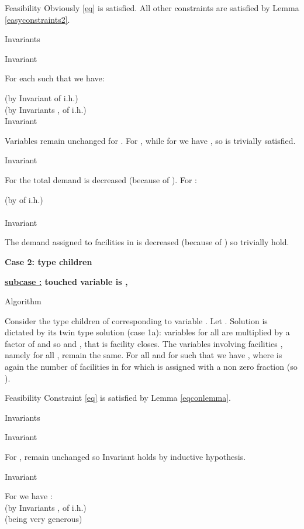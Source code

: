 \documentclass[11pt]{article}\usepackage{amsmath}
\begin{document}
{\sc Feasibility}
Obviously \eqref{eq} is satisfied. All other constraints are satisfied by 
Lemma \ref{easyconstraints2}.

{\sc Invariants}

{\sf Invariant }

For each  such that  we have:

\noindent
\hfill (by Invariant  of i.h.)\\
\hfill (by Invariants
,  of i.h.)\\


{\sf Invariant }

Variables  remain unchanged for . For ,  while for 
we have , so  is trivially satisfied.

{\sf Invariant }

For  the total demand is decreased (because of ). For :

\noindent
\hfill (by  of i.h.)\\
\\

{\sf Invariant }

The demand assigned to facilities in  is decreased  (because of ) 
so   trivially hold. 





\medskip \medskip
\noindent
{\bf Case 2: type  children}

\noindent 
{\bf \underline{subcase :} touched variable is  , }

{\sc Algorithm}

Consider the type  children  of  corresponding to variable .
Let . Solution  is dictated by its twin type  solution (case 1a):
 variables  for all  are multiplied by a factor of  and so   and , that is facility  closes. The variables involving facilities , namely  for all , remain the same. 
For all  and for  such that  we have , where  is again the number of
facilities in  for which  is assigned with a non zero fraction (so ).


{\sc Feasibility}
Constraint \eqref{eq} is satisfied by Lemma \ref{eqconlemma}.

{\sc Invariants}

{\sf Invariant }

For ,  remain unchanged so Invariant  holds by inductive hypothesis.

{\sf Invariant }

For  we have :\\

\noindent
 \hfill (by Invariants ,  of i.h.)\\
 \hfill (being very generous)\\
  
\end{document}
